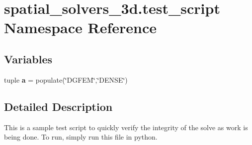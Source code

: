 \hypertarget{namespacespatial__solvers__3d_1_1test__script}{\section{spatial\-\_\-solvers\-\_\-3d.\-test\-\_\-script Namespace Reference}
\label{namespacespatial__solvers__3d_1_1test__script}
}
\subsection*{Variables}
\begin{DoxyCompactItemize}
\item 
\hypertarget{namespacespatial__solvers__3d_1_1test__script_a4ebe6e153000a7d29becae719c6c6189}{tuple {\bfseries a} = populate(\char`\"{}D\-G\-F\-E\-M\char`\"{},\char`\"{}D\-E\-N\-S\-E\char`\"{})}\label{namespacespatial__solvers__3d_1_1test__script_a4ebe6e153000a7d29becae719c6c6189}

\end{DoxyCompactItemize}


\subsection{Detailed Description}
\begin{DoxyVerb}This is a sample test script to quickly verify the integrity of the solve as work is being done.  To run, 
simply run this file in python. \end{DoxyVerb}
 